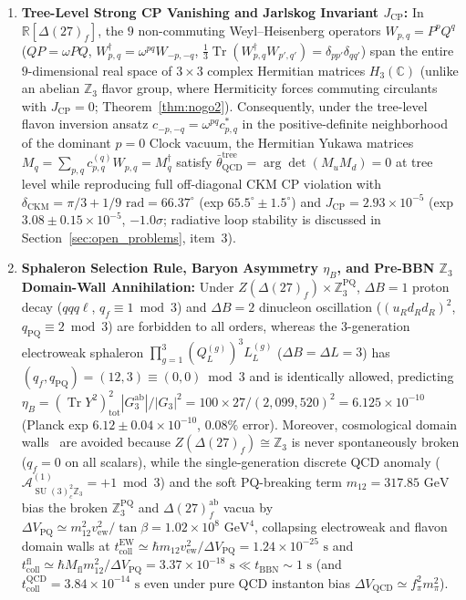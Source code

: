 \documentclass[11pt,a4paper]{article}
\theoremstyle{definition}
\theoremstyle{remark}
\newcommand{\R}{\mathbb{R}}
\newcommand{\C}{\mathbb{C}}
\newcommand{\Z}{\mathbb{Z}}
\newcommand{\Tr}{\operatorname{Tr}}
\newcommand{\SU}{\operatorname{SU}}
\newcommand{\Gthree}{G_3}
\begin{document}
\begin{enumerate}
    \item \textbf{Tree-Level Strong CP Vanishing and Jarlskog Invariant $J_{\mathrm{CP}}$:} In $\R[\Delta(27)_f]$, the $9$ non-commuting Weyl--Heisenberg operators $W_{p,q} = P^p Q^q$ ($QP = \omega PQ$, $W_{p,q}^\dagger = \omega^{pq} W_{-p,-q}$, $\frac{1}{3}\Tr(W_{p,q}^\dagger W_{p',q'}) = \delta_{pp'}\delta_{qq'}$) span the entire $9$-dimensional real space of $3 \times 3$ complex Hermitian matrices $H_3(\C)$ (unlike an abelian $\Z_3$ flavor group, where Hermiticity forces commuting circulants with $J_{\mathrm{CP}} = 0$; Theorem~\ref{thm:nogo2}). Consequently, under the tree-level flavon inversion ansatz $c_{-p,-q} = \omega^{pq} c_{p,q}^*$ in the positive-definite neighborhood of the dominant $p = 0$ Clock vacuum, the Hermitian Yukawa matrices $M_q = \sum_{p,q} c_{p,q}^{(q)} W_{p,q} = M_q^\dagger$ satisfy $\bar{\theta}_{\mathrm{QCD}}^{\mathrm{tree}} = \arg\det(M_u M_d) = 0$ at tree level while reproducing full off-diagonal CKM CP violation with $\delta_{\mathrm{CKM}} = \pi/3 + 1/9\text{ rad} = 66.37^\circ$ (exp $65.5^\circ \pm 1.5^\circ$) and $J_{\mathrm{CP}} = 2.93 \times 10^{-5}$ (exp $3.08 \pm 0.15 \times 10^{-5}$, $-1.0\sigma$; radiative loop stability is discussed in Section~\ref{sec:open_problems}, item~3).
    \item \textbf{Sphaleron Selection Rule, Baryon Asymmetry $\eta_B$, and Pre-BBN $\Z_3$ Domain-Wall Annihilation:} Under $Z(\Delta(27)_f) \times \Z_3^{\mathrm{PQ}}$, $\Delta B = 1$ proton decay ($qqq\ell$, $q_f \equiv 1 \bmod 3$) and $\Delta B = 2$ dinucleon oscillation ($(u_R d_R d_R)^2$, $q_{\mathrm{PQ}} \equiv 2 \bmod 3$) are forbidden to all orders, whereas the $3$-generation electroweak sphaleron $\prod_{g=1}^3 (Q_L^{(g)})^3 L_L^{(g)}$ ($\Delta B = \Delta L = 3$) has $(q_f, q_{\mathrm{PQ}}) = (12, 3) \equiv (0, 0) \bmod 3$ and is identically allowed, predicting $\eta_B = (\Tr Y^2)_{\mathrm{tot}}^2 |\Gthree^{\mathrm{ab}}| / |\Gthree|^2 = 100 \times 27 / (2{,}099{,}520)^2 = 6.125 \times 10^{-10}$ (Planck exp $6.12 \pm 0.04 \times 10^{-10}$, $0.08\%$ error). Moreover, cosmological domain walls~\cite{Zeldovich1974} are avoided because $Z(\Delta(27)_f) \cong \Z_3$ is never spontaneously broken ($q_f = 0$ on all scalars), while the single-generation discrete QCD anomaly ($\mathcal{A}_{\SU(3)_c^2\Z_3}^{(1)} = +1 \bmod 3$) and the soft PQ-breaking term $m_{12} = 317.85\text{ GeV}$ bias the broken $\Z_3^{\mathrm{PQ}}$ and $\Delta(27)_f^{\mathrm{ab}}$ vacua by $\Delta V_{\mathrm{PQ}} \simeq m_{12}^2 v_{\mathrm{ew}}^2 / \tan\beta = 1.02 \times 10^8\text{ GeV}^4$, collapsing electroweak and flavon domain walls at $t_{\mathrm{coll}}^{\mathrm{EW}} \simeq \hbar m_{12}v_{\mathrm{ew}}^2 / \Delta V_{\mathrm{PQ}} = 1.24 \times 10^{-25}\text{ s}$ and $t_{\mathrm{coll}}^{\mathrm{fl}} \simeq \hbar M_{\mathrm{fl}}m_{12}^2 / \Delta V_{\mathrm{PQ}} = 3.37 \times 10^{-18}\text{ s} \ll t_{\mathrm{BBN}} \sim 1\text{ s}$ (and $t_{\mathrm{coll}}^{\mathrm{QCD}} = 3.84 \times 10^{-14}\text{ s}$ even under pure QCD instanton bias $\Delta V_{\mathrm{QCD}} \simeq f_\pi^2 m_\pi^2$).

\end{enumerate}
\end{document}
